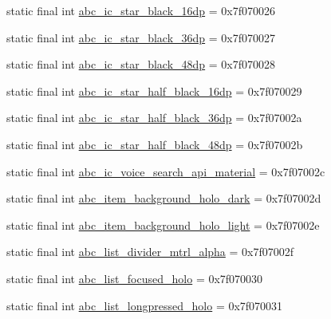 \begin{DoxyCompactItemize}
\item 
static final int \mbox{\hyperlink{classandroid_1_1support_1_1design_1_1R_1_1drawable_a1349833a92af4cf33ba5ba40922424cd}{abc\+\_\+ic\+\_\+star\+\_\+black\+\_\+16dp}} = 0x7f070026
\item 
static final int \mbox{\hyperlink{classandroid_1_1support_1_1design_1_1R_1_1drawable_a53c64840aafc7cb905a77e8ae43146fa}{abc\+\_\+ic\+\_\+star\+\_\+black\+\_\+36dp}} = 0x7f070027
\item 
static final int \mbox{\hyperlink{classandroid_1_1support_1_1design_1_1R_1_1drawable_ad675e83333ff2144c1caf279418c8c36}{abc\+\_\+ic\+\_\+star\+\_\+black\+\_\+48dp}} = 0x7f070028
\item 
static final int \mbox{\hyperlink{classandroid_1_1support_1_1design_1_1R_1_1drawable_a93bca0ef4c914b420f16b575f153cb9f}{abc\+\_\+ic\+\_\+star\+\_\+half\+\_\+black\+\_\+16dp}} = 0x7f070029
\item 
static final int \mbox{\hyperlink{classandroid_1_1support_1_1design_1_1R_1_1drawable_a7d30855bcf34cff38d00c8dda284eef5}{abc\+\_\+ic\+\_\+star\+\_\+half\+\_\+black\+\_\+36dp}} = 0x7f07002a
\item 
static final int \mbox{\hyperlink{classandroid_1_1support_1_1design_1_1R_1_1drawable_a3c43eadf8e065ab4783200e4657248d3}{abc\+\_\+ic\+\_\+star\+\_\+half\+\_\+black\+\_\+48dp}} = 0x7f07002b
\item 
static final int \mbox{\hyperlink{classandroid_1_1support_1_1design_1_1R_1_1drawable_aa07112ae69ed5850fa0c44fa53e619f1}{abc\+\_\+ic\+\_\+voice\+\_\+search\+\_\+api\+\_\+material}} = 0x7f07002c
\item 
static final int \mbox{\hyperlink{classandroid_1_1support_1_1design_1_1R_1_1drawable_a7b733f9057a2cff89be485f9cd6928d5}{abc\+\_\+item\+\_\+background\+\_\+holo\+\_\+dark}} = 0x7f07002d
\item 
static final int \mbox{\hyperlink{classandroid_1_1support_1_1design_1_1R_1_1drawable_a43f7ea0b127c030b4e1a667243515c79}{abc\+\_\+item\+\_\+background\+\_\+holo\+\_\+light}} = 0x7f07002e
\item 
static final int \mbox{\hyperlink{classandroid_1_1support_1_1design_1_1R_1_1drawable_abb445bd8a123081407a9b597f769ad61}{abc\+\_\+list\+\_\+divider\+\_\+mtrl\+\_\+alpha}} = 0x7f07002f
\item 
static final int \mbox{\hyperlink{classandroid_1_1support_1_1design_1_1R_1_1drawable_a1d26c3d76e535036aa21aa917a88cb4e}{abc\+\_\+list\+\_\+focused\+\_\+holo}} = 0x7f070030
\item 
static final int \mbox{\hyperlink{classandroid_1_1support_1_1design_1_1R_1_1drawable_aacb9ee6a5ba24e73df7340a9e8f73314}{abc\+\_\+list\+\_\+longpressed\+\_\+holo}} = 0x7f070031

\end{DoxyCompactItemize}
